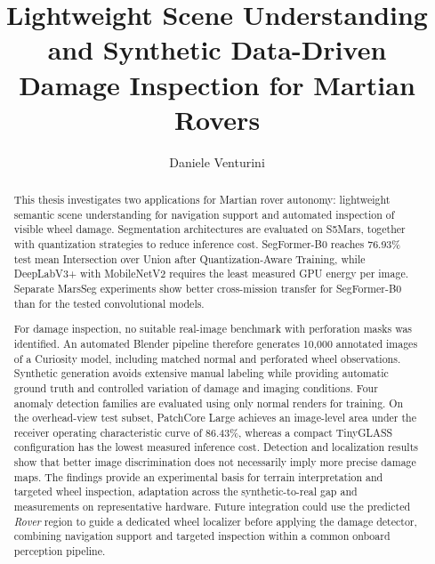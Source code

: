 \documentclass[binding=0.6cm]{sapthesis}
\title{Lightweight Scene Understanding and Synthetic Data-Driven Damage Inspection for Martian Rovers}
\author{Daniele Venturini}
\begin{document}
\frontmatter
\maketitle
\dedication{Dedicato a\\ da scrivere}

\raggedbottom

\begin{abstract}
	This thesis investigates two applications for Martian rover autonomy: lightweight semantic scene understanding for navigation support and automated inspection of visible wheel damage. Segmentation architectures are evaluated on S5Mars, together with quantization strategies to reduce inference cost. SegFormer-B0 reaches 76.93\% test mean Intersection over Union after Quantization-Aware Training, while DeepLabV3+ with MobileNetV2 requires the least measured GPU energy per image. Separate MarsSeg experiments show better cross-mission transfer for SegFormer-B0 than for the tested convolutional models.

	For damage inspection, no suitable real-image benchmark with perforation masks was identified. An automated Blender pipeline therefore generates 10,000 annotated images of a Curiosity model, including matched normal and perforated wheel observations. Synthetic generation avoids extensive manual labeling while providing automatic ground truth and controlled variation of damage and imaging conditions. Four anomaly detection families are evaluated using only normal renders for training. On the overhead-view test subset, PatchCore Large achieves an image-level area under the receiver operating characteristic curve of 86.43\%, whereas a compact TinyGLASS configuration has the lowest measured inference cost. Detection and localization results show that better image discrimination does not necessarily imply more precise damage maps. The findings provide an experimental basis for terrain interpretation and targeted wheel inspection, adaptation across the synthetic-to-real gap and measurements on representative hardware. Future integration could use the predicted \emph{Rover} region to guide a dedicated wheel localizer before applying the damage detector, combining navigation support and targeted inspection within a common onboard perception pipeline.
\end{abstract}

\tableofcontents

\mainmatter








\end{document}
